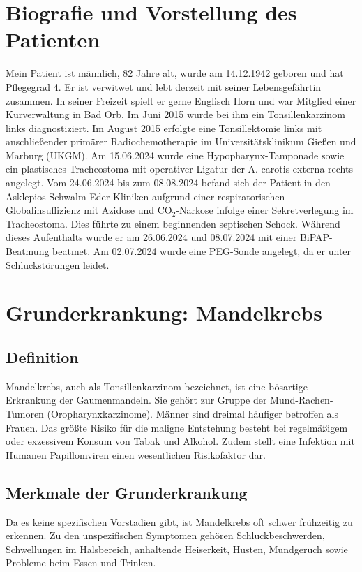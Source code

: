 \documentclass[a4paper,12pt]{article}
\begin{document}
\section{Biografie und Vorstellung des Patienten}
Mein Patient ist männlich, 82 Jahre alt, wurde am 14.12.1942 geboren
und hat Pflegegrad 4. Er ist verwitwet und 
lebt derzeit mit seiner Lebensgefährtin zusammen.
In seiner Freizeit spielt er gerne Englisch Horn 
und war Mitglied einer Kurverwaltung in Bad Orb.
Im Juni 2015 wurde bei ihm ein Tonsillenkarzinom links diagnostiziert. Im
August 2015 erfolgte eine Tonsillektomie links mit anschließender primärer
Radiochemotherapie im Universitätsklinikum Gießen und Marburg (UKGM).
Am 15.06.2024 wurde eine Hypopharynx-Tamponade sowie ein plastisches
Tracheostoma mit operativer Ligatur der A. carotis externa rechts angelegt.
Vom 24.06.2024 bis zum 08.08.2024 befand sich der Patient in den
Asklepios-Schwalm-Eder-Kliniken aufgrund einer respiratorischen
Globalinsuffizienz mit Azidose und CO$_2$-Narkose infolge einer
Sekretverlegung im Tracheostoma. Dies führte zu einem beginnenden septischen
Schock. Während dieses Aufenthalts wurde er am 26.06.2024 und 08.07.2024 mit
einer BiPAP-Beatmung beatmet. Am 02.07.2024 wurde eine PEG-Sonde angelegt,
da er unter Schluckstörungen leidet.

\section{Grunderkrankung: Mandelkrebs}

\subsection{Definition}
Mandelkrebs, auch als Tonsillenkarzinom bezeichnet, ist eine bösartige
Erkrankung der Gaumenmandeln. Sie gehört zur Gruppe der Mund-Rachen-Tumoren
(Oropharynxkarzinome). Männer sind dreimal häufiger betroffen als Frauen.
Das größte Risiko für die maligne Entstehung besteht bei regelmäßigem oder
exzessivem Konsum von Tabak und Alkohol. Zudem stellt eine Infektion mit
Humanen Papillomviren einen wesentlichen Risikofaktor dar.

\subsection{Merkmale der Grunderkrankung}
Da es keine spezifischen Vorstadien gibt, ist Mandelkrebs oft schwer frühzeitig
zu erkennen. Zu den unspezifischen Symptomen gehören Schluckbeschwerden,
Schwellungen im Halsbereich, anhaltende Heiserkeit, Husten, Mundgeruch sowie
Probleme beim Essen und Trinken.
\end{document}
